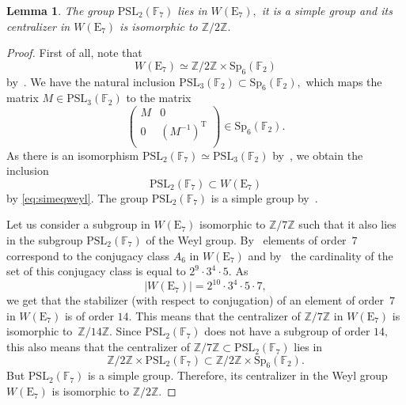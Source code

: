 \documentclass{amsart}
\numberwithin{equation}{section}
\newtheorem{Lemma}[subsection]{Lemma}
\theoremstyle{definition}
\begin{document}
\begin{Lemma}\label{lemma:centralizer}
The group $\mathrm{PSL}_2(\mathbb{F}_7)$ lies in $W(\mathrm{E}_7),$ it is a simple group and its centralizer in  $W(\mathrm{E}_7)$ is isomorphic to $\mathbb{Z}/2\mathbb{Z}.$
\end{Lemma}

\begin{proof}
First of all, note that 
\begin{equation}\label{eq:simeqweyl}
W(\mathrm{E}_7) \simeq \mathbb{Z}/2\mathbb{Z} \times \mathrm{Sp}_6(\mathbb{F}_2)
\end{equation}
\noindent by~\cite[\S 3.12.4]{Wil}. We have the natural inclusion $\mathrm{PSL}_3(\mathbb{F}_2) \subset \mathrm{Sp}_6(\mathbb{F}_2),$ which maps the matrix $M \in \mathrm{PSL}_3(\mathbb{F}_2)$ to the matrix
$$
\begin{pmatrix}
M & 0\\
0 & (M^{-1})^{\mathrm{T}}\\
\end{pmatrix}
\in \mathrm{Sp}_6(\mathbb{F}_2).
$$
\noindent As there is an isomorphism $\mathrm{PSL}_2(\mathbb{F}_7) \simeq \mathrm{PSL}_3(\mathbb{F}_2)$ by~\cite[\S 3.12.1]{Wil}, we obtain the inclusion 
$$
\mathrm{PSL}_2(\mathbb{F}_7) \subset W(\mathrm{E}_7)
$$
\noindent by \eqref{eq:simeqweyl}. The group $\mathrm{PSL}_2(\mathbb{F}_7)$ is a simple group by~\cite[\S 3.3.1]{Wil}.

Let us consider a subgroup in $W(\mathrm{E}_7)$ isomorphic to $\mathbb{Z}/7\mathbb{Z}$ such that it  also lies in the subgroup $\mathrm{PSL}_2(\mathbb{F}_7)$ of the Weyl group.  By~\cite[Table 1]{Trepalin} elements of order~$7$ correspond to the conjugacy class $A_6$ in $W(\mathrm{E}_7)$ and by~\cite[Table 10]{Carter} the cardinality of the set of this conjugacy class is equal to $2^9 \cdot 3^4 \cdot 5.$ As 
$$
|W(\mathrm{E}_7)|=2^{10}\cdot 3^4 \cdot 5 \cdot 7,
$$
\noindent we get that the stabilizer (with respect to conjugation) of an element of order~$7$ in $W(\mathrm{E}_7)$ is of order $14.$ This means that the centralizer of $\mathbb{Z}/7\mathbb{Z}$ in $W(\mathrm{E}_7)$ is isomorphic to~$\mathbb{Z}/14\mathbb{Z}.$ Since $\mathrm{PSL}_2(\mathbb{F}_7)$ does not have a subgroup of order $14,$ this also means that the centralizer of $\mathbb{Z}/7\mathbb{Z} \subset \mathrm{PSL}_2(\mathbb{F}_7)$ lies in 
$$
\mathbb{Z}/2\mathbb{Z} \times\mathrm{PSL}_2(\mathbb{F}_7) \subset \mathbb{Z}/2\mathbb{Z} \times \mathrm{Sp}_6(\mathbb{F}_2).
$$
\noindent  But $\mathrm{PSL}_2(\mathbb{F}_7)$ is a simple group. Therefore, its centralizer in the Weyl group $W(\mathrm{E}_7)$ is isomorphic to $\mathbb{Z}/2\mathbb{Z}.$


\end{proof}
\end{document}
